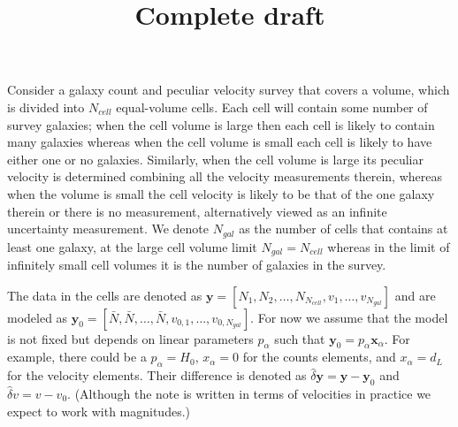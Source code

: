 \documentclass{article}
\title{Complete draft}
\begin{document}
\maketitle



Consider a galaxy count and peculiar velocity survey that covers a volume, which is divided into $N_{cell}$ equal-volume cells.  Each cell will contain some
number of survey galaxies; when the cell volume is large then each cell is likely to contain many galaxies whereas when the cell volume is small each cell is likely
to have either one or no galaxies.  Similarly, when the cell volume is large  its  peculiar velocity is determined combining all the velocity measurements therein,
whereas when the volume is small the cell velocity is likely to be that of the one galaxy therein or there is no measurement, alternatively viewed as an infinite
uncertainty measurement.  We denote $N_{gal}$ as the number of cells that contains at least one galaxy, at the large cell volume limit
$N_{gal}=N_{cell}$ whereas in the limit of infinitely small cell volumes it is
the number of galaxies in the survey.

The data in the cells are denoted as $\textbf{y} = [N_1, N_2, \hdots, N_{N_{cell}}, v_1, \hdots, v_{N_{gal}}]$
and are modeled as $\textbf{y}_0 =[\bar{N}, \bar{N}, \hdots, \bar{N}, v_{0,1}, \hdots, v_{0,N_{gal}}]$.  For now we assume that the model is not fixed but depends
on linear parameters $p_\alpha$ such that
 $\textbf{y}_0 = p_\alpha \textbf{x}_\alpha$.
For example, there could be  a $p_\alpha = H_0$, $x_\alpha=0$ for the counts elements, and $x_\alpha=d_L$ for the velocity elements. 
Their difference is  denoted as $\hat{\delta} \textbf{y}= \textbf{y} - \textbf{y}_0 $ and $\hat{\delta} v= v-v_0$.  (Although the note is written in terms of velocities
in practice we expect to work with magnitudes.)
\end{document}
